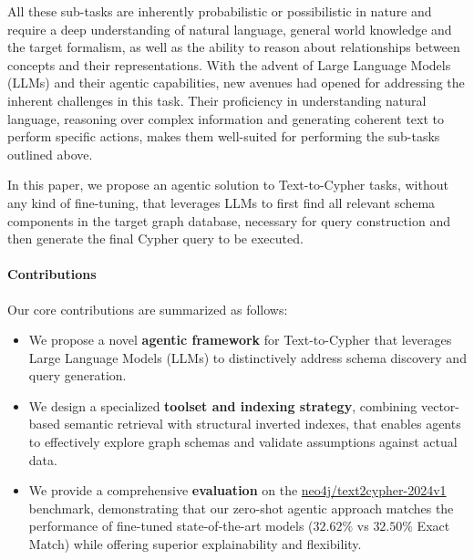 %
All these sub-tasks are inherently probabilistic or possibilistic in nature and require a deep understanding of natural language, general world knowledge and the target formalism, as well as the ability to reason about relationships between concepts and their representations. With the advent of Large Language Models (LLMs) and their agentic capabilities, new avenues had opened for addressing the inherent challenges in this task. Their proficiency in understanding natural language, reasoning over complex information and generating coherent text to perform specific actions, makes them well-suited for performing the sub-tasks outlined above.

In this paper, we propose an agentic solution to Text-to-Cypher tasks, without any kind of fine-tuning, that leverages LLMs to first find all relevant schema components in the target graph database, necessary for query construction and then generate the final Cypher query to be executed.

\paragraph{Contributions} Our core contributions are summarized as follows:
\begin{itemize}
    \item We propose a novel \textbf{agentic framework} for Text-to-Cypher that leverages Large Language Models (LLMs) to distinctively address schema discovery and query generation.
    \item We design a specialized \textbf{toolset and indexing strategy}, combining vector-based semantic retrieval with structural inverted indexes, that enables agents to effectively explore graph schemas and validate assumptions against actual data.
    \item We provide a comprehensive \textbf{evaluation} on the \href{https://huggingface.co/datasets/neo4j/text2cypher-2024v1}{neo4j/text2cypher-2024v1} benchmark, demonstrating that our zero-shot agentic approach matches the performance of fine-tuned state-of-the-art models ($32.62\%$ vs $32.50\%$ Exact Match) while offering superior explainability and flexibility.
\end{itemize}


